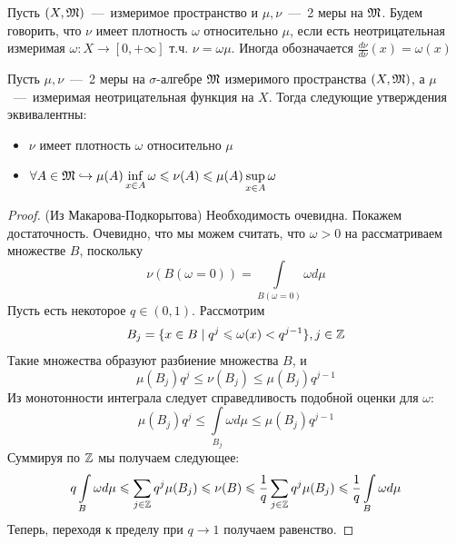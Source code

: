 \begin{definition}
    Пусть $(X, \mathfrak{M})$~---~измеримое пространство и $\mu, \nu$~---~2 меры на $\mathfrak{M}$. Будем говорить, что $\nu$ имеет плотность $\omega$ относительно $\mu$, если есть неотрицательная измеримая $\omega: X \rightarrow [0, +\infty]$ т.ч. $\nu = \omega\mu$. Иногда обозначается $\frac{d \nu}{d \nu}(x) = \omega(x)$
\end{definition}
\begin{theorem}
    Пусть $\mu, \nu$~---~2 меры на $\sigma$-алгебре $\mathfrak{M}$ измеримого пространства $(X, \mathfrak{M})$, а $\mu$~---~измеримая неотрицательная функция на $X$. Тогда следующие утверждения эквивалентны: \begin{itemize}
        \item $\nu$ имеет плотность $\omega$ относительно $\mu$
        \item $\forall A \in \mathfrak{M} \hookrightarrow \mu(A)\inf\limits_{x \in A} \omega \leqslant \nu(A) \leqslant \mu(A)\sup\limits_{x \in A} \omega$
    \end{itemize}
\end{theorem}
\begin{proof}
    (Из Макарова-Подкорытова) Необходимость очевидна. Покажем достаточность. Очевидно, что мы можем считать, что $\omega > 0$ на рассматриваем множестве $B$, поскольку \[\nu(B(\omega = 0)) = \int\limits_{B(\omega = 0)} \omega d\mu\]
    Пусть есть некоторое $q \in (0, 1)$. Рассмотрим \[B_j = \{x \in B \mid q^j \leqslant \omega(x) < q^{j - 1}\}, j \in \mathbb{Z}\]
    Такие множества образуют разбиение множества $B$, и \[\mu(B_j)q^j \leq \nu(B_j) \leq \mu(B_j)q^{j - 1}\]
    Из монотонности интеграла следует справедливость подобной оценки для $\omega$: \[\mu(B_j)q^j \leq \int\limits_{B_j}\omega d\mu \leq \mu(B_j)q^{j - 1}\]
    Суммируя по $\mathbb{Z}$ мы получаем следующее: \[q\int\limits_{B} \omega d\mu \leqslant \sum\limits_{j \in \mathbb{Z}} q^j\mu(B_j) \leqslant \nu(B) \leqslant \dfrac{1}{q} \sum\limits_{j \in \mathbb{Z}} q^j \mu(B_j) \leqslant \dfrac{1}{q}\int\limits_B \omega d\mu\]
    Теперь, переходя к пределу при $q \rightarrow 1$ получаем равенство.
\end{proof}
